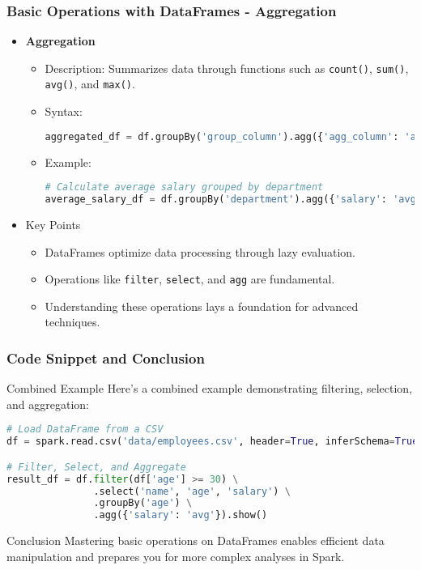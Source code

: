 \documentclass[aspectratio=169]{beamer}
\begin{document}
\begin{frame}[fragile]
    \frametitle{Basic Operations with DataFrames - Aggregation}
    \begin{itemize}
        \item \textbf{Aggregation}
            \begin{itemize}
                \item Description: Summarizes data through functions such as \texttt{count()}, \texttt{sum()}, \texttt{avg()}, and \texttt{max()}.
                \item Syntax:
                \begin{lstlisting}[language=Python]
aggregated_df = df.groupBy('group_column').agg({'agg_column': 'agg_function'})
                \end{lstlisting}
                \item Example:
                \begin{lstlisting}[language=Python]
# Calculate average salary grouped by department
average_salary_df = df.groupBy('department').agg({'salary': 'avg'})
                \end{lstlisting}
            \end{itemize}
        \item Key Points
            \begin{itemize}
                \item DataFrames optimize data processing through lazy evaluation.
                \item Operations like \texttt{filter}, \texttt{select}, and \texttt{agg} are fundamental.
                \item Understanding these operations lays a foundation for advanced techniques.
            \end{itemize}
    \end{itemize}
\end{frame}

\begin{frame}[fragile]
    \frametitle{Code Snippet and Conclusion}
    \begin{block}{Combined Example}
    Here's a combined example demonstrating filtering, selection, and aggregation:
    \begin{lstlisting}[language=Python]
# Load DataFrame from a CSV
df = spark.read.csv('data/employees.csv', header=True, inferSchema=True)

# Filter, Select, and Aggregate
result_df = df.filter(df['age'] >= 30) \
               .select('name', 'age', 'salary') \
               .groupBy('age') \
               .agg({'salary': 'avg'}).show()
    \end{lstlisting}
    \end{block}

    \begin{block}{Conclusion}
        Mastering basic operations on DataFrames enables efficient data manipulation and prepares you for more complex analyses in Spark.
    \end{block}
\end{frame}
\end{document}
